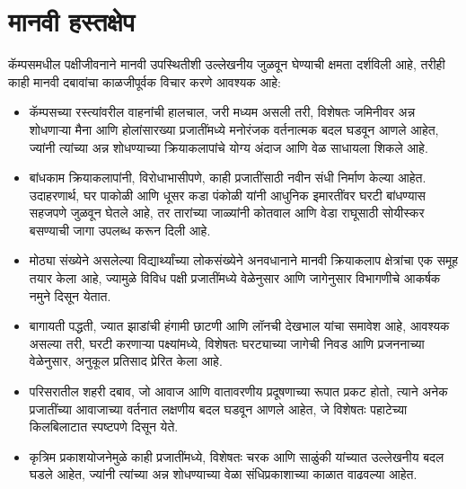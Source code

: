 \documentclass[a4paper,12pt,landscape]{memoir}
\begin{document}
{  \section*{\textbf{मानवी हस्तक्षेप}}
  कॅम्पसमधील पक्षीजीवनाने मानवी उपस्थितीशी उल्लेखनीय जुळवून घेण्याची क्षमता दर्शविली आहे, तरीही काही मानवी दबावांचा काळजीपूर्वक विचार करणे आवश्यक आहे:

  \begin{itemize}
  \item कॅम्पसच्या रस्त्यांवरील वाहनांची हालचाल, जरी मध्यम असली तरी, विशेषतः जमिनीवर अन्न शोधणाऱ्या मैना आणि होलांसारख्या प्रजातींमध्ये मनोरंजक वर्तनात्मक बदल घडवून आणले आहेत, ज्यांनी त्यांच्या अन्न शोधण्याच्या क्रियाकलापांचे योग्य अंदाज आणि वेळ साधायला शिकले आहे.
  
  \item बांधकाम क्रियाकलापांनी, विरोधाभासीपणे, काही प्रजातींसाठी नवीन संधी निर्माण केल्या आहेत. उदाहरणार्थ, घर पाकोळी आणि धूसर कडा पंकोळी यांनी आधुनिक इमारतींवर घरटी बांधण्यास सहजपणे जुळवून घेतले आहे, तर तारांच्या जाळ्यांनी कोतवाल आणि वेडा राघूसाठी सोयीस्कर बसण्याची जागा उपलब्ध करून दिली आहे.
  
  \item मोठ्या संख्येने असलेल्या विद्यार्थ्यांच्या लोकसंख्येने अनवधानाने मानवी क्रियाकलाप क्षेत्रांचा एक समूह तयार केला आहे, ज्यामुळे विविध पक्षी प्रजातींमध्ये वेळेनुसार आणि जागेनुसार विभागणीचे आकर्षक नमुने दिसून येतात.
  
  \item बागायती पद्धती, ज्यात झाडांची हंगामी छाटणी आणि लॉनची देखभाल यांचा समावेश आहे, आवश्यक असल्या तरी, घरटी करणाऱ्या पक्ष्यांमध्ये, विशेषतः घरट्याच्या जागेची निवड आणि प्रजननाच्या वेळेनुसार, अनुकूल प्रतिसाद प्रेरित केला आहे.
  
  \item परिसरातील शहरी दबाव, जो आवाज आणि वातावरणीय प्रदूषणाच्या रूपात प्रकट होतो, त्याने अनेक प्रजातींच्या आवाजाच्या वर्तनात लक्षणीय बदल घडवून आणले आहेत, जे विशेषतः पहाटेच्या किलबिलाटात स्पष्टपणे दिसून येते.
  
  \item कृत्रिम प्रकाशयोजनेमुळे काही प्रजातींमध्ये, विशेषतः चरक आणि साळुंकी यांच्यात उल्लेखनीय बदल घडले आहेत, ज्यांनी त्यांच्या अन्न शोधण्याच्या वेळा संधिप्रकाशाच्या काळात वाढवल्या आहेत.
  \end{itemize}
}
\end{document}
